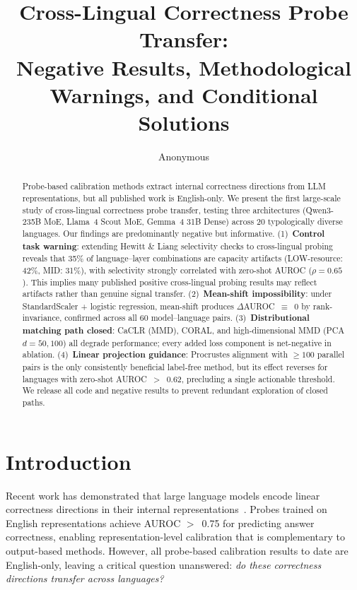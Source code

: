 \documentclass[11pt,a4paper]{article}
\title{Cross-Lingual Correctness Probe Transfer:\\Negative Results, Methodological Warnings, and Conditional Solutions}
\author{Anonymous}
\begin{document}
\maketitle

\begin{abstract}
Probe-based calibration methods extract internal correctness directions from LLM representations, but all published work is English-only.
We present the first large-scale study of cross-lingual correctness probe transfer, testing three architectures (Qwen3-235B MoE, Llama~4 Scout MoE, Gemma~4 31B Dense) across 20 typologically diverse languages.
Our findings are predominantly negative but informative.
(1)~\textbf{Control task warning}: extending Hewitt \& Liang selectivity checks to cross-lingual probing reveals that 35\% of language--layer combinations are capacity artifacts (LOW-resource: 42\%, MID: 31\%), with selectivity strongly correlated with zero-shot AUROC ($\rho{=}0.65$). This implies many published positive cross-lingual probing results may reflect artifacts rather than genuine signal transfer.
(2)~\textbf{Mean-shift impossibility}: under StandardScaler + logistic regression, mean-shift produces $\Delta$AUROC~$\equiv$~0 by rank-invariance, confirmed across all 60 model--language pairs.
(3)~\textbf{Distributional matching path closed}: CaCLR (MMD), CORAL, and high-dimensional MMD (PCA $d{=}50,100$) all degrade performance; every added loss component is net-negative in ablation.
(4)~\textbf{Linear projection guidance}: Procrustes alignment with ${\geq}100$ parallel pairs is the only consistently beneficial label-free method, but its effect reverses for languages with zero-shot AUROC~$>$~0.62, precluding a single actionable threshold.
We release all code and negative results to prevent redundant exploration of closed paths.
\end{abstract}

\section{Introduction}
\label{sec:intro}

Recent work has demonstrated that large language models encode linear correctness directions in their internal representations~\cite{miao2026coral,burns2023discovering}.
Probes trained on English representations achieve AUROC $>$~0.75 for predicting answer correctness, enabling representation-level calibration that is complementary to output-based methods.
However, all probe-based calibration results to date are English-only, leaving a critical question unanswered: \emph{do these correctness directions transfer across languages?}
\end{document}
